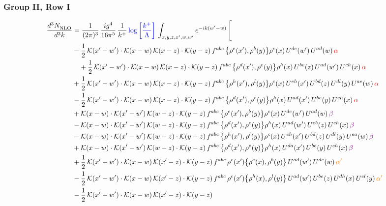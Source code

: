 \documentclass[9pt]{article}
\numberwithin{equation}{section}
\begin{document}
\subsubsection{Group II, Row I}
\begin{align}
     \frac{d^{3}N_{\rm NLO}^{\rm}}{d^{3}k}  & = \frac{1}{(2\pi)^{3}}\, \frac{ig^{4}}{16\pi^{5}}\, \frac{1}{k^{+}}\, {\color{blue}\log{\left[\frac{k^{+}}{\Lambda}\right]}}\, \int_{x,y,z,x^{\prime},w,w^{\prime}}e^{-ik(w^{\prime}-w)}\, \Bigg[\notag \\ & -\frac{1}{2}\,\mathcal{K}(x'-w')\cdot\mathcal{K}(x-w)\,\mathcal{K}(x-z)\cdot\mathcal{K}(y-z)\, f^{abc}\,\big\{\rho^{e}(x'),\rho^{b}(y)\big\}\rho^{c}(x)\,U^{de}(w')\,U^{ad}(w)\,{\color{red}\alpha}\notag \\ &\quad+\frac{1}{2}\,\mathcal{K}(x'-w')\cdot\mathcal{K}(x-w)\,\mathcal{K}(x-z)\cdot\mathcal{K}(y-z)\, f^{abc}\,\big\{\rho^{d}(x'),\rho^{e}(y)\big\}\rho^{h}(x)\,U^{be}(z)\,U^{ad}(w')\,U^{ch}(x)\,{\color{red}\alpha}\notag\\ & +\frac{1}{2}\,\mathcal{K}(x'-w')\cdot\mathcal{K}(x-w)\,\mathcal{K}(x-z)\cdot\mathcal{K}(y-z)\, f^{abc}\,\big\{\rho^{h}(x'),\rho^{l}(y)\big\}\rho^{c}(x)\,U^{eh}(x')\,U^{bd}(z)\,U^{dl}(y)\,U^{ae}(w)\,{\color{red}\alpha}\notag \\ &-\frac{1}{2}\,\mathcal{K}(x'-w')\cdot\mathcal{K}(x-w)\,\mathcal{K}(x-z)\cdot\mathcal{K}(y-z)\, f^{abc}\,\big\{\rho^{d}(x'),\rho^{e}(y)\big\}\rho^{h}(x)\,U^{ad}(x')\,U^{be}(y)\,U^{ch}(x)\,{\color{red}\alpha}\notag\\ &+\mathcal{K}(x-w)\cdot\mathcal{K}(x'-w')\,\mathcal{K}(w-z)\cdot\mathcal{K}(y-z)\, f^{abc}\,\big\{\rho^{e}(x'),\rho^{b}(y)\big\}\rho^{c}(x)\,U^{de}(w')\,U^{ad}(w)\,{\color{violet}\beta}\notag\\ &-\mathcal{K}(x-w)\cdot\mathcal{K}(x'-w')\,\mathcal{K}(w-z)\cdot\mathcal{K}(y-z)\, f^{abc}\,\big\{\rho^{d}(x'),\rho^{e}(y)\big\}\rho^{h}(x)\,U^{ad}(w')\,U^{eb}(z)\,U^{ch}(x)\,{\color{violet}\beta}\notag \\ &-\mathcal{K}(x-w)\cdot\mathcal{K}(x'-w')\,\mathcal{K}(w-z)\cdot\mathcal{K}(y-z)\, f^{abc}\,\big\{\rho^{h}(x'),\rho^{l}(y)\big\}\rho^{c}(x)\,U^{eh}(x')\,U^{bd}(z)\,U^{dl}(y)\,U^{ea}(w)\,{\color{violet}\beta}\notag \\ & +\mathcal{K}(x-w)\cdot\mathcal{K}(x'-w')\,\mathcal{K}(w-z)\cdot\mathcal{K}(y-z)\, f^{abc}\,\big\{\rho^{d}(x'),\rho^{e}(y)\big\}\rho^{h}(x)\,U^{da}(x')\,U^{be}(y)\,U^{ch}(x)\,{\color{violet}\beta}\notag \\ &+\frac{1}{2}\,\mathcal{K}(x'-w')\cdot\mathcal{K}(x-w)\,\mathcal{K}(x'-z)\cdot\mathcal{K}(y-z)\, f^{abc}\,\rho^{c}(x')\big\{\rho^{e}(x),\rho^{b}(y)\big\}\,U^{ad}(w')\,U^{de}(w)\,{\color{orange}\alpha'}\notag \\ &-\frac{1}{2}\,\mathcal{K}(x'-w')\cdot\mathcal{K}(x-w)\,\mathcal{K}(x'-z)\cdot\mathcal{K}(y-z)\, f^{abc}\,\rho^{c}(x')\big\{\rho^{h}(x),\rho^{l}(y)\big\}\,U^{ad}(w')\,U^{be}(z)\,U^{dh}(x)\,U^{el}(y)\,{\color{orange}\alpha'}\notag \\ &-\frac{1}{2}\,\mathcal{K}(x'-w')\cdot\mathcal{K}(x-w)\,\mathcal{K}(x'-z)\cdot\mathcal{K}(y-z)\, 
\end{align}
\end{document}
